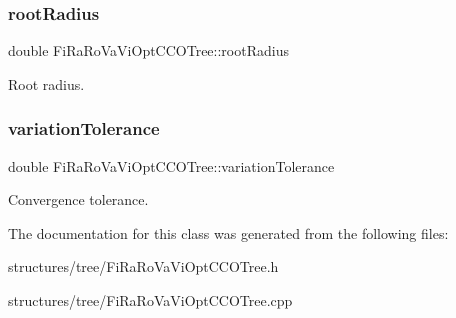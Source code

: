 \subsubsection{\texorpdfstring{root\+Radius}{rootRadius}}
{\footnotesize\ttfamily double Fi\+Ra\+Ro\+Va\+Vi\+Opt\+C\+C\+O\+Tree\+::root\+Radius\hspace{0.3cm}{\ttfamily [private]}}

Root radius. \mbox{\label{class_fi_ra_ro_va_vi_opt_c_c_o_tree_a78be49c68bbe3604b8ca309eb077d879}} 
\subsubsection{\texorpdfstring{variation\+Tolerance}{variationTolerance}}
{\footnotesize\ttfamily double Fi\+Ra\+Ro\+Va\+Vi\+Opt\+C\+C\+O\+Tree\+::variation\+Tolerance\hspace{0.3cm}{\ttfamily [private]}}

Convergence tolerance. 

The documentation for this class was generated from the following files\+:\begin{DoxyCompactItemize}
\item 
structures/tree/Fi\+Ra\+Ro\+Va\+Vi\+Opt\+C\+C\+O\+Tree.\+h\item 
structures/tree/Fi\+Ra\+Ro\+Va\+Vi\+Opt\+C\+C\+O\+Tree.\+cpp\end{DoxyCompactItemize}
